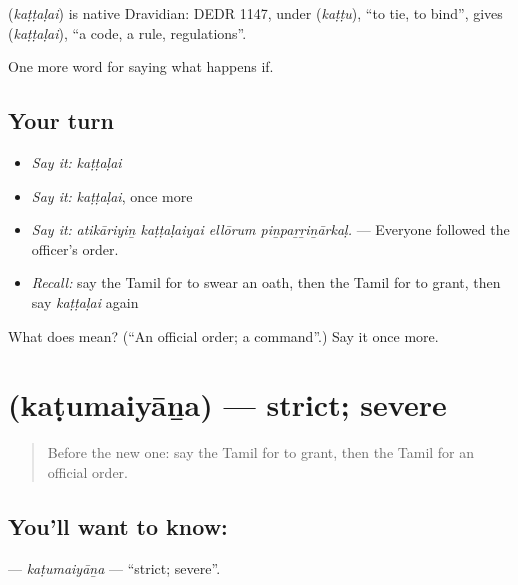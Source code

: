 \begin{cousinweb}
\textbf{} (\emph{kaṭṭaḷai}) is native Dravidian: DEDR 1147, under  (\emph{kaṭṭu}), \textquotedblleft{}to tie, to bind\textquotedblright{}, gives  (\emph{kaṭṭaḷai}), \textquotedblleft{}a code, a rule, regulations\textquotedblright{}.
\end{cousinweb}

\begin{grammarlens}[title={What you've built}]
One more word for saying what happens if.
\end{grammarlens}

\subsection*{Your turn}
\begin{itemize}
\raggedright
  \item \emph{Say it:} \emph{kaṭṭaḷai}
  \item \emph{Say it:} \emph{kaṭṭaḷai}, once more
  \item \emph{Say it:} \emph{atikāriyiṉ kaṭṭaḷaiyai ellōrum piṉpaṟṟiṉārkaḷ.} — Everyone followed the officer's order.
  \item \emph{Recall:} say the Tamil for to swear an oath, then the Tamil for to grant, then say \emph{kaṭṭaḷai} again
\end{itemize}

\begin{tcolorbox}[breakable,colback=teal!4,colframe=teal!35!black,title={Before you move on}]
What does  mean? (\textquotedblleft{}An official order; a command\textquotedblright{}.) Say it once more.
\end{tcolorbox}
\section[\texorpdfstring{\ta{கடுமையான} (kaṭumaiyāṉa)}{கடுமையான (kaṭumaiyāṉa)}]{ (kaṭumaiyāṉa) — strict; severe}

\label{lesson:TA-C543-katumaiyana}



\begin{quote}
Before the new one: say the Tamil for to grant, then the Tamil for an official order.
\end{quote}

\subsection*{You'll want to know: }
\textbf{} — \emph{kaṭumaiyāṉa} — \textquotedblleft{}strict; severe\textquotedblright{}.

